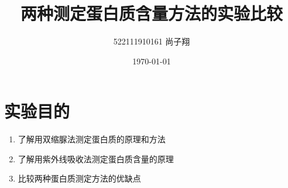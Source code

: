 \documentclass[UTF8]{ctexart}
\title{两种测定蛋白质含量方法的实验比较}
\author{522111910161 尚子翔}
\date{\today}
\begin{document}
\fancyhead[L]{}
\fancyfoot[C]{\thepage}

\maketitle
\tableofcontents
\newpage

\section{实验目的}
\begin{enumerate}
    \item 了解用双缩脲法测定蛋白质的原理和方法
    \item 了解用紫外线吸收法测定蛋白质含量的原理
    \item 比较两种蛋白质测定方法的优缺点
\end{enumerate}
\end{document}
